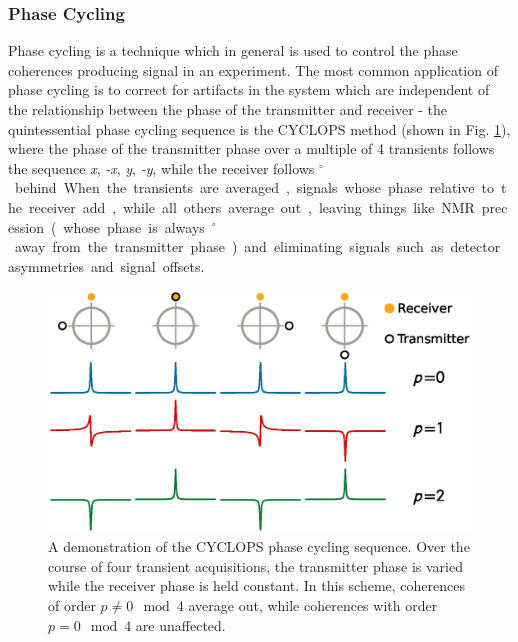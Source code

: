 \documentclass[PaulGanssle-Thesis.tex]{subfiles}
\begin{document}
\subsubsection{Phase Cycling}
\label{console.software.phase.cycling}
Phase cycling is a technique which in general is used to control the phase coherences producing signal in an experiment. The most common application of phase cycling is to correct for artifacts in the system which are independent of the relationship between the phase of the transmitter and receiver - the quintessential phase cycling sequence is the CYCLOPS\cite{Keeler2013} method (shown in Fig. \ref{fig:CyclopsPhaseCycle}), where the phase of the transmitter phase over a multiple of 4 transients follows the sequence \textit{x}, \textit{-x}, \textit{y}, \textit{-y}, while the receiver follows \unit[90]{$^\circ$} behind. When the transients are averaged, signals whose phase relative to the receiver add, while all others average out, leaving things like NMR precession (whose phase is always \unit[90]{$^\circ$} away from the transmitter phase) and eliminating signals such as detector asymmetries and signal offsets.

\begin{figure}[!h]
\includegraphics[width=\textwidth]{figures/console/CYCLOPS.eps}
\caption{A demonstration of the CYCLOPS phase cycling sequence. Over the course of four transient acquisitions, the transmitter phase is varied while the receiver phase is held constant. In this scheme, coherences of order $p \neq 0 \mod{4}$ average out, while coherences with order $p = 0 \mod{4}$ are unaffected.}
\label{fig:CyclopsPhaseCycle}
\end{figure}
\end{document}
